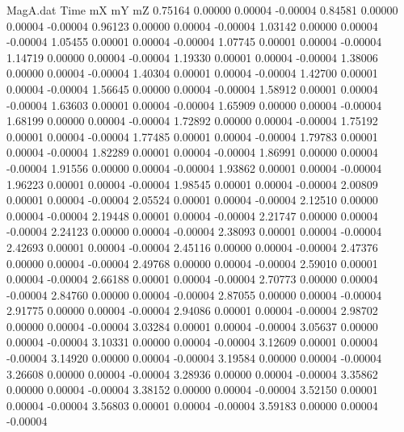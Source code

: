 \begin{filecontents}{MagA.dat}
Time mX mY mZ
   0.75164    0.00000    0.00004   -0.00004
   0.84581    0.00000    0.00004   -0.00004
   0.96123    0.00000    0.00004   -0.00004
   1.03142    0.00000    0.00004   -0.00004
   1.05455    0.00001    0.00004   -0.00004
   1.07745    0.00001    0.00004   -0.00004
   1.14719    0.00000    0.00004   -0.00004
   1.19330    0.00001    0.00004   -0.00004
   1.38006    0.00000    0.00004   -0.00004
   1.40304    0.00001    0.00004   -0.00004
   1.42700    0.00001    0.00004   -0.00004
   1.56645    0.00000    0.00004   -0.00004
   1.58912    0.00001    0.00004   -0.00004
   1.63603    0.00001    0.00004   -0.00004
   1.65909    0.00000    0.00004   -0.00004
   1.68199    0.00000    0.00004   -0.00004
   1.72892    0.00000    0.00004   -0.00004
   1.75192    0.00001    0.00004   -0.00004
   1.77485    0.00001    0.00004   -0.00004
   1.79783    0.00001    0.00004   -0.00004
   1.82289    0.00001    0.00004   -0.00004
   1.86991    0.00000    0.00004   -0.00004
   1.91556    0.00000    0.00004   -0.00004
   1.93862    0.00001    0.00004   -0.00004
   1.96223    0.00001    0.00004   -0.00004
   1.98545    0.00001    0.00004   -0.00004
   2.00809    0.00001    0.00004   -0.00004
   2.05524    0.00001    0.00004   -0.00004
   2.12510    0.00000    0.00004   -0.00004
   2.19448    0.00001    0.00004   -0.00004
   2.21747    0.00000    0.00004   -0.00004
   2.24123    0.00000    0.00004   -0.00004
   2.38093    0.00001    0.00004   -0.00004
   2.42693    0.00001    0.00004   -0.00004
   2.45116    0.00000    0.00004   -0.00004
   2.47376    0.00000    0.00004   -0.00004
   2.49768    0.00000    0.00004   -0.00004
   2.59010    0.00001    0.00004   -0.00004
   2.66188    0.00001    0.00004   -0.00004
   2.70773    0.00000    0.00004   -0.00004
   2.84760    0.00000    0.00004   -0.00004
   2.87055    0.00000    0.00004   -0.00004
   2.91775    0.00000    0.00004   -0.00004
   2.94086    0.00001    0.00004   -0.00004
   2.98702    0.00000    0.00004   -0.00004
   3.03284    0.00001    0.00004   -0.00004
   3.05637    0.00000    0.00004   -0.00004
   3.10331    0.00000    0.00004   -0.00004
   3.12609    0.00001    0.00004   -0.00004
   3.14920    0.00000    0.00004   -0.00004
   3.19584    0.00000    0.00004   -0.00004
   3.26608    0.00000    0.00004   -0.00004
   3.28936    0.00000    0.00004   -0.00004
   3.35862    0.00000    0.00004   -0.00004
   3.38152    0.00000    0.00004   -0.00004
   3.52150    0.00001    0.00004   -0.00004
   3.56803    0.00001    0.00004   -0.00004
   3.59183    0.00000    0.00004   -0.00004

\end{filecontents}

